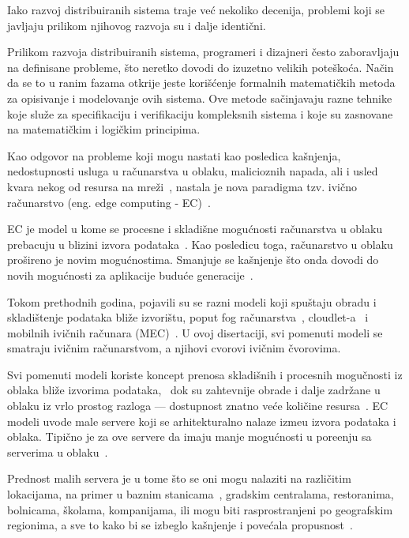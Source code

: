 Iako razvoj distribuiranih sistema traje ve\'c nekoliko decenija, problemi koji se javljaju prilikom njihovog razvoja su i dalje identi\v cni. 

Prilikom razvoja distribuiranih sistema, programeri i dizajneri \v cesto zaboravljaju na definisane probleme, \v sto neretko dovodi do izuzetno velikih pote\v sko\'ca. Na\v cin da se to u ranim fazama otkrije jeste kori\v s\'cenje formalnih matemati\v ckih metoda za opisivanje i modelovanje ovih sistema. Ove metode sa\v cinjavaju razne tehnike koje slu\v ze za specifikaciju i verifikaciju kompleksnih sistema i koje su zasnovane na matemati\v ckim i logi\v ckim principima.

Kao odgovor na probleme koji mogu nastati kao posledica ka\v snjenja, nedostupnosti usluga u ra\v cunarstva u oblaku, malicioznih napada, ali i usled kvara nekog od resursa na mre\v zi~\cite{GunawiHSLSAE16}, nastala je nova paradigma tzv. ivi\v cno ra\v cunarstvo (eng. edge computing - EC)~\cite{Satyanarayanan17}. 

EC je model u kome se procesne i skladi\v sne mogu\'cnosti ra\v cunarstva u oblaku prebacuju u blizini izvora podataka~\cite{Satyanarayanan17}. Kao posledicu toga, ra\v cunarstvo u oblaku pro\v sireno je novim mogu\'cnostima. Smanjuje se ka\v snjenje \v sto onda dovodi do novih mogu\'cnosti za aplikacije budu\'ce generacije~\cite{NingLSY20}.   

Tokom prethodnih godina, pojavili su se razni modeli koji spu\v staju obradu i skladi\v stenje podataka bli\v ze izvori\v stu, poput fog ra\v cunarstva~\cite{BonomiMNZ14}, cloudlet-a~\cite {MonsalveCC18} i mobilnih ivi\v cnih ra\v cunara (MEC)~\cite{WangZZWYW17}. U ovoj disertaciji, svi pomenuti modeli se smatraju ivi\v cnim ra\v cunarstvom, a njihovi cvorovi ivi\v cnim \v cvorovima. 

Svi pomenuti modeli koriste koncept prenosa skladi\v snih i procesnih mogu\v cnosti iz oblaka bli\v ze izvorima podataka,~\cite{KhuneP19} dok su zahtevnije obrade i dalje zadr\v zane u oblaku iz vrlo prostog razloga --- dostupnost znatno ve\'ce koli\v cine resursa~\cite{NingLSY20}. EC modeli uvode male servere koji se arhitekturalno nalaze izme\dj u izvora podataka i oblaka. Tipi\v cno je za ove servere da imaju manje mogu\'cnosti u pore\dj enju sa serverima u oblaku~\cite{ChenHLLW15}. 

Prednost malih servera je u tome \v sto se oni mogu nalaziti na razli\v citim lokacijama, na primer u baznim stanicama~\cite{WangZZWYW17}, gradskim centralama, restoranima, bolnicama, \v skolama, kompanijama, ili mogu biti rasprostranjeni po geografskim regionima, a sve to kako bi se izbeglo ka\v snjenje i pove\'cala propusnost~\cite{MonsalveCC18}.   

